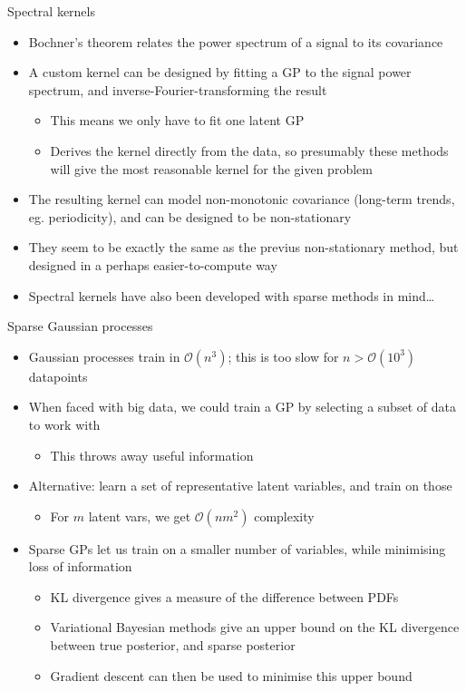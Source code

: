 \documentclass[presentation]{beamer}
\begin{document}
\begin{frame}[label={sec:org01a81ff}]{Spectral kernels}
\begin{itemize}
\item Bochner's theorem relates the power spectrum of a signal to its covariance
\item A custom kernel can be designed by fitting a GP to the signal power spectrum, and inverse-Fourier-transforming the result
\begin{itemize}
\item This means we only have to fit one latent GP
\item Derives the kernel directly from the data, so presumably these methods will give the most reasonable kernel for the given problem
\end{itemize}
\item The resulting kernel can model non-monotonic covariance (long-term trends, eg. periodicity), and can be designed to be non-stationary
\item They seem to be exactly the same as the previus non-stationary method, but designed in a perhaps easier-to-compute way
\end{itemize}

\vfill

\begin{itemize}
\item Spectral kernels have also been developed with sparse methods in mind\ldots{}
\end{itemize}
\end{frame}

\begin{frame}[label={sec:org90ef1f1}]{Sparse Gaussian processes}
\begin{itemize}
\item Gaussian processes train in \(\mathcal{O}(n^3)\); this is too slow for \(n>\mathcal{O}(10^3)\) datapoints
\item When faced with big data, we could train a GP by selecting a subset of data to work with
\begin{itemize}
\item This throws away useful information
\end{itemize}
\item Alternative: learn a set of representative latent variables, and train on those
\begin{itemize}
\item For \(m\) latent vars, we get \(\mathcal{O}(nm^2)\) complexity
\end{itemize}
\item Sparse GPs let us train on a smaller number of variables, while minimising loss of information
\begin{itemize}
\item KL divergence gives a measure of the difference between PDFs
\item Variational Bayesian methods give an upper bound on the KL divergence between true posterior, and sparse posterior
\item Gradient descent can then be used to minimise this upper bound
\end{itemize}
\end{itemize}
\end{frame}
\end{document}
